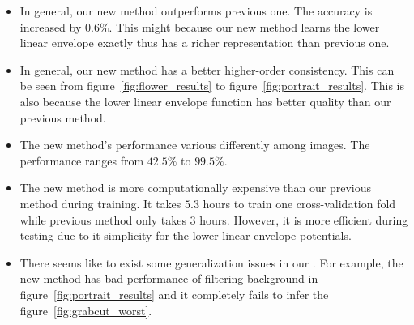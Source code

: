 \begin{itemize}
\item In general, our new method outperforms previous one.
  The accuracy is increased by $0.6\%$. This might because our
  new method learns the lower linear envelope exactly thus has a
  richer representation than previous one.
\item In general, our new method has a better higher-order
  consistency. This can be seen from
  figure~\ref{fig:flower_results} to
  figure~\ref{fig:portrait_results}. This is also because the
  lower linear envelope function has better quality than our
  previous method.
\item The new method's performance various differently among
  images. The performance ranges from $42.5\%$ to $99.5\%$.
\item The new method is more computationally expensive than our
  previous method during training. It takes $5.3$ hours to train
  one cross-validation fold while previous method only takes
  $3$ hours. However, it is more efficient during testing due to
  it simplicity for the lower linear envelope potentials.
\item There seems like to exist some generalization issues in our
  . For example, the new method has bad
  performance of filtering background in
  figure~\ref{fig:portrait_results} and it completely fails to
  infer the figure~\ref{fig:grabcut_worst}.
\end{itemize}



\clearpage
\cleardoublepage



